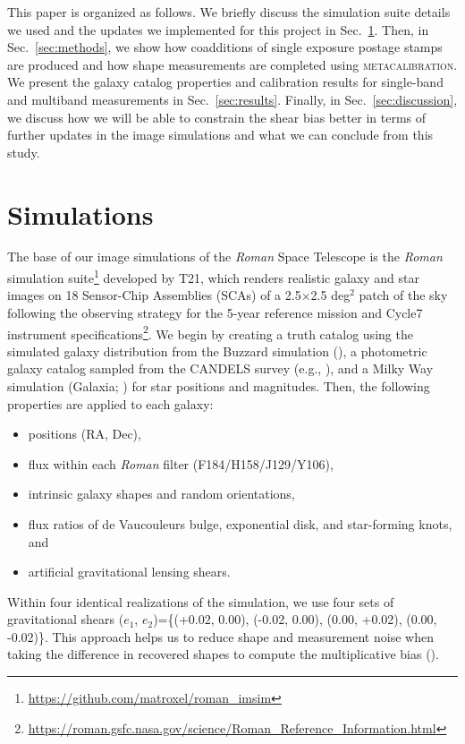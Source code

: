 \documentclass[fleqn,usenatbib]{mnras}
\begin{document}
This paper is organized as follows. We briefly discuss the simulation suite details we used and the updates we implemented for this project in Sec.~\ref{sec:sims}. Then, in Sec.~\ref{sec:methods}, we show how coadditions of single exposure postage stamps are produced and how shape measurements are completed using \textsc{metacalibration}. We present the galaxy catalog properties and calibration results for single-band and multiband measurements in Sec.~\ref{sec:results}. Finally, in Sec.~\ref{sec:discussion}, we discuss how we will be able to constrain the shear bias better in terms of further updates in the image simulations and what we can conclude from this study. 


\section{Simulations}
\label{sec:sims}
The base of our image simulations of the \emph{Roman} Space Telescope is the \emph{Roman} simulation suite\footnote{\url{ https://github.com/matroxel/roman_imsim}} developed by T21, which renders realistic galaxy and star images on 18 Sensor-Chip Assemblies (SCAs) of a 2.5$\times$2.5 deg$^{2}$ patch of the sky following the observing strategy for the 5-year reference mission and Cycle7 instrument specifications\footnote{\url{https://roman.gsfc.nasa.gov/science/Roman_Reference_Information.html}}. We begin by creating a truth catalog using the simulated galaxy distribution from the Buzzard simulation (\citealt{2019arXiv190102401D}), a photometric galaxy catalog sampled from the CANDELS survey (e.g., \citealt{2019ApJ...877..117H}), and a Milky Way simulation (Galaxia; \citealt{2011ApJ...730....3S}) for star positions and magnitudes. Then, the following properties are applied to each galaxy:
\begin{itemize}
    \item positions (RA, Dec),
    \item flux within each \emph{Roman} filter (F184/H158/J129/Y106),
    \item intrinsic galaxy shapes and random orientations,
    \item flux ratios of de Vaucouleurs bulge, exponential disk, and star-forming knots, and
    \item artificial gravitational lensing shears.
\end{itemize} 
Within four identical realizations of the simulation, we use four sets of gravitational shears ($e_{1}$, $e_{2}$)=\{(+0.02, 0.00), (-0.02, 0.00), (0.00, +0.02), (0.00, -0.02)\}. This approach helps us to reduce shape and measurement noise when taking the difference in recovered shapes to compute the multiplicative bias (\citealt{2019A&A...621A...2P}). 
\end{document}
